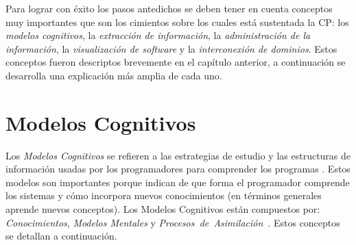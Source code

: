 Para lograr con éxito los pasos antedichos se deben tener en cuenta conceptos muy importantes que son los cimientos sobre los cuales está sustentada la CP: los \textit{modelos cognitivos}, la \textit{extracción de información}, la \textit{administración de la información}, la \textit{visualización de software} y la \textit{interconexión de dominios}. Estos conceptos fueron descriptos brevemente en el capítulo anterior, a continuación se desarrolla una explicación más amplia de cada uno.

\section{Modelos Cognitivos}

Los \textit{Modelos Cognitivos} se refieren a las estrategias de estudio y las estructuras de información usadas por los programadores para comprender los programas \cite{TIE89,VMAVA95,BROOK82,STOREY99}. Estos modelos  son importantes porque indican de que forma el programador comprende los sistemas y cómo incorpora nuevos conocimientos (en términos generales aprende nuevos conceptos).
Los Modelos Cognitivos están compuestos por: \textit{Conocimientos}, \textit{Modelos Mentales} y \mbox{\textit{Procesos de Asimilación} \cite{MBPHRU10}.} Estos conceptos se detallan a continuación.

